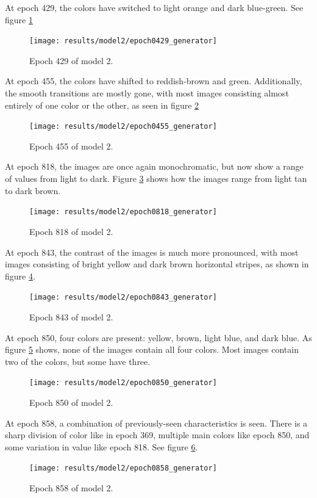 \documentclass[11pt,letterpaper]{article}
\begin{document}
				At epoch 429, the colors have switched to light orange and dark blue-green.
				See figure \ref{fig:cgvg:epoch0429generator}
				\begin{figure}
					\centering
					\texttt{[image: results/model2/epoch0429\_generator]}
					\caption{Epoch 429 of model 2.}
					\label{fig:cgvg:epoch0429generator}
				\end{figure}

				At epoch 455, the colors have shifted to reddish-brown and green.
				Additionally, the smooth transitions are mostly gone, with most images consisting almost entirely of one color or the other, as seen in figure \ref{fig:cgvg:epoch0455generator}
				\begin{figure}
					\centering
					\texttt{[image: results/model2/epoch0455\_generator]}
					\caption{Epoch 455 of model 2.}
					\label{fig:cgvg:epoch0455generator}
				\end{figure}

				At epoch 818, the images are once again monochromatic, but now show a range of values from light to dark.
				Figure \ref{fig:cgvg:epoch0818generator} shows how the images range from light tan to dark brown.
				\begin{figure}
					\centering
					\texttt{[image: results/model2/epoch0818\_generator]}
					\caption{Epoch 818 of model 2.}
					\label{fig:cgvg:epoch0818generator}
				\end{figure}

				At epoch 843, the contrast of the images is much more pronounced, with most images consisting of bright yellow and dark brown horizontal stripes, as shown in figure \ref{fig:cgvg:epoch0843generator}.
				\begin{figure}
					\centering
					\texttt{[image: results/model2/epoch0843\_generator]}
					\caption{Epoch 843 of model 2.}
					\label{fig:cgvg:epoch0843generator}
				\end{figure}

				At epoch 850, four colors are present: yellow, brown, light blue, and dark blue.
				As figure \ref{fig:cgvg:epoch0850generator} shows, none of the images contain all four colors.
				Most images contain two of the colors, but some have three.
				\begin{figure}
					\centering
					\texttt{[image: results/model2/epoch0850\_generator]}
					\caption{Epoch 850 of model 2.}
					\label{fig:cgvg:epoch0850generator}
				\end{figure}

				At epoch 858, a combination of previously-seen characteristics is seen.
				There is a sharp division of color like in epoch 369, multiple main colors like epoch 850, and some variation in value like epoch 818.
				See figure \ref{fig:cgvg:epoch0858generator}.
				\begin{figure}
					\centering
					\texttt{[image: results/model2/epoch0858\_generator]}
					\caption{Epoch 858 of model 2.}
					\label{fig:cgvg:epoch0858generator}
				\end{figure}
\end{document}
